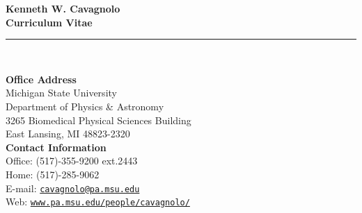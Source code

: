 \documentclass[12pt]{cv}
\begin{document}
\begin{center}
{\huge \textbf{\sc Kenneth W. Cavagnolo\\ \large Curriculum Vitae}}\\
\rule{17.35cm}{1pt}\\
\end{center}
\normalsize

\addresses
{
{\bf Office Address}\\
Michigan State University\\
Department of Physics \& Astronomy\\
3265 Biomedical Physical Sciences Building\\
East Lansing, MI 48823-2320\\
}
{
{\bf Contact Information}\\
Office: (517)-355-9200 ext.2443\\
Home: (517)-285-9062\\
E-mail: \href{mailto:cavagnolo@pa.msu.edu}{\tt{cavagnolo@pa.msu.edu}}\\
Web: \href{http://www.pa.msu.edu/people/cavagnolo/}{\tt www.pa.msu.edu/people/cavagnolo/}\\
}
\end{document}
